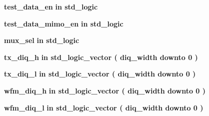 \begin{DoxyCompactItemize}
\item 
{\bf test\+\_\+data\+\_\+en}  {\bfseries {\bfseries \textcolor{keywordflow}{in}\textcolor{vhdlchar}{ }}} {\bfseries \textcolor{comment}{std\+\_\+logic}\textcolor{vhdlchar}{ }} 
\item 
{\bf test\+\_\+data\+\_\+mimo\+\_\+en}  {\bfseries {\bfseries \textcolor{keywordflow}{in}\textcolor{vhdlchar}{ }}} {\bfseries \textcolor{comment}{std\+\_\+logic}\textcolor{vhdlchar}{ }} 
\item 
{\bf mux\+\_\+sel}  {\bfseries {\bfseries \textcolor{keywordflow}{in}\textcolor{vhdlchar}{ }}} {\bfseries \textcolor{comment}{std\+\_\+logic}\textcolor{vhdlchar}{ }} 
\item 
{\bf tx\+\_\+diq\+\_\+h}  {\bfseries {\bfseries \textcolor{keywordflow}{in}\textcolor{vhdlchar}{ }}} {\bfseries \textcolor{comment}{std\+\_\+logic\+\_\+vector}\textcolor{vhdlchar}{ }\textcolor{vhdlchar}{(}\textcolor{vhdlchar}{ }\textcolor{vhdlchar}{ }\textcolor{vhdlchar}{ }\textcolor{vhdlchar}{ }{\bfseries {\bf diq\+\_\+width}} \textcolor{vhdlchar}{ }\textcolor{keywordflow}{downto}\textcolor{vhdlchar}{ }\textcolor{vhdlchar}{ } \textcolor{vhdldigit}{0} \textcolor{vhdlchar}{ }\textcolor{vhdlchar}{)}\textcolor{vhdlchar}{ }} 
\item 
{\bf tx\+\_\+diq\+\_\+l}  {\bfseries {\bfseries \textcolor{keywordflow}{in}\textcolor{vhdlchar}{ }}} {\bfseries \textcolor{comment}{std\+\_\+logic\+\_\+vector}\textcolor{vhdlchar}{ }\textcolor{vhdlchar}{(}\textcolor{vhdlchar}{ }\textcolor{vhdlchar}{ }\textcolor{vhdlchar}{ }\textcolor{vhdlchar}{ }{\bfseries {\bf diq\+\_\+width}} \textcolor{vhdlchar}{ }\textcolor{keywordflow}{downto}\textcolor{vhdlchar}{ }\textcolor{vhdlchar}{ } \textcolor{vhdldigit}{0} \textcolor{vhdlchar}{ }\textcolor{vhdlchar}{)}\textcolor{vhdlchar}{ }} 
\item 
{\bf wfm\+\_\+diq\+\_\+h}  {\bfseries {\bfseries \textcolor{keywordflow}{in}\textcolor{vhdlchar}{ }}} {\bfseries \textcolor{comment}{std\+\_\+logic\+\_\+vector}\textcolor{vhdlchar}{ }\textcolor{vhdlchar}{(}\textcolor{vhdlchar}{ }\textcolor{vhdlchar}{ }\textcolor{vhdlchar}{ }\textcolor{vhdlchar}{ }{\bfseries {\bf diq\+\_\+width}} \textcolor{vhdlchar}{ }\textcolor{keywordflow}{downto}\textcolor{vhdlchar}{ }\textcolor{vhdlchar}{ } \textcolor{vhdldigit}{0} \textcolor{vhdlchar}{ }\textcolor{vhdlchar}{)}\textcolor{vhdlchar}{ }} 
\item 
{\bf wfm\+\_\+diq\+\_\+l}  {\bfseries {\bfseries \textcolor{keywordflow}{in}\textcolor{vhdlchar}{ }}} {\bfseries \textcolor{comment}{std\+\_\+logic\+\_\+vector}\textcolor{vhdlchar}{ }\textcolor{vhdlchar}{(}\textcolor{vhdlchar}{ }\textcolor{vhdlchar}{ }\textcolor{vhdlchar}{ }\textcolor{vhdlchar}{ }{\bfseries {\bf diq\+\_\+width}} \textcolor{vhdlchar}{ }\textcolor{keywordflow}{downto}\textcolor{vhdlchar}{ }\textcolor{vhdlchar}{ } \textcolor{vhdldigit}{0} \textcolor{vhdlchar}{ }\textcolor{vhdlchar}{)}\textcolor{vhdlchar}{ }} 

\end{DoxyCompactItemize}
